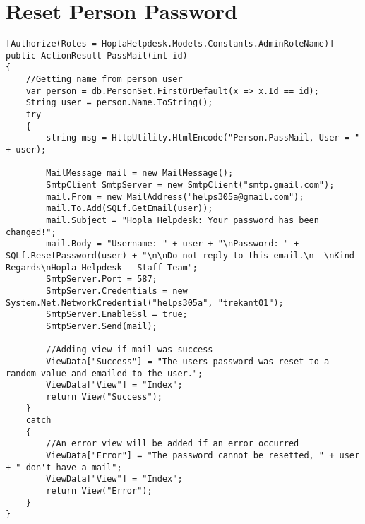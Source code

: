 \section{Reset Person Password}
\label{sec:resetpersonpassword}

\begin{lstlisting}[style=sourceCode, caption=\myCaption{The \me{PassMail} method}, label=lst:passmail,float=hp]
[Authorize(Roles = HoplaHelpdesk.Models.Constants.AdminRoleName)]
public ActionResult PassMail(int id)
{
    //Getting name from person user
    var person = db.PersonSet.FirstOrDefault(x => x.Id == id);
    String user = person.Name.ToString();
    try
    {
        string msg = HttpUtility.HtmlEncode("Person.PassMail, User = " + user);
            
        MailMessage mail = new MailMessage();
        SmtpClient SmtpServer = new SmtpClient("smtp.gmail.com");
        mail.From = new MailAddress("helps305a@gmail.com");
        mail.To.Add(SQLf.GetEmail(user));
        mail.Subject = "Hopla Helpdesk: Your password has been changed!";
        mail.Body = "Username: " + user + "\nPassword: " + SQLf.ResetPassword(user) + "\n\nDo not reply to this email.\n--\nKind Regards\nHopla Helpdesk - Staff Team";
        SmtpServer.Port = 587;
        SmtpServer.Credentials = new System.Net.NetworkCredential("helps305a", "trekant01");
        SmtpServer.EnableSsl = true;
        SmtpServer.Send(mail);

        //Adding view if mail was success
        ViewData["Success"] = "The users password was reset to a random value and emailed to the user.";
        ViewData["View"] = "Index";
        return View("Success");
    }
    catch
    {
        //An error view will be added if an error occurred
        ViewData["Error"] = "The password cannot be resetted, " + user + " don't have a mail";
        ViewData["View"] = "Index";
        return View("Error");
    }
}
\end{lstlisting}


